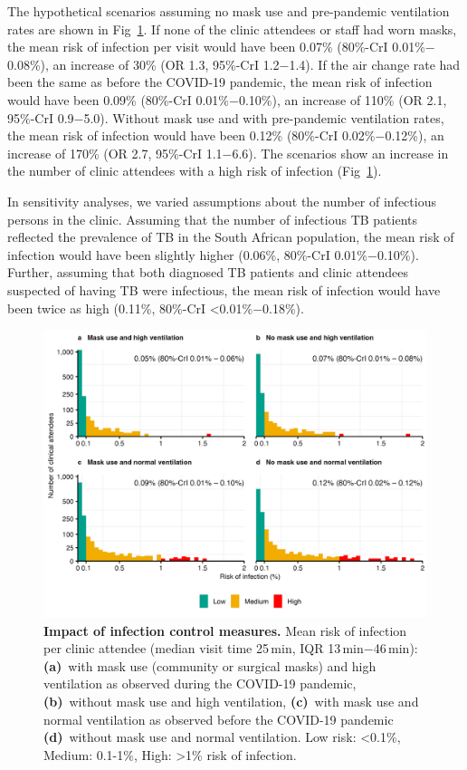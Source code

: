 \documentclass[fleqn,11pt]{wlscirep}
\begin{document}
The hypothetical scenarios assuming no mask use and pre-pandemic ventilation rates are shown in  Fig~\ref{fig:scenario-results}. If none of the clinic attendees or staff had worn masks, the mean risk of infection per visit would have been 0.07\% (80\%-CrI 0.01\%$-$0.08\%), an increase of 30\% (OR 1.3, 95\%-CrI 1.2$-$1.4). If the air change rate had been the same as before the COVID-19 pandemic, the mean risk of infection would have been 0.09\% (80\%-CrI 0.01\%$-$0.10\%), an increase of 110\% (OR 2.1, 95\%-CrI 0.9$-$5.0). Without mask use and with pre-pandemic ventilation rates, the mean risk of infection would have been 0.12\% (80\%-CrI 0.02\%$-$0.12\%), an increase of 170\% (OR 2.7, 95\%-CrI 1.1$-$6.6). The scenarios show an increase in the number of clinic attendees with a high risk of infection (Fig~\ref{fig:scenario-results}). 

In sensitivity analyses, we varied assumptions about the number of infectious persons in the clinic. Assuming that the number of infectious TB patients reflected the prevalence of TB in the South African population, the mean risk of infection would have been slightly higher (0.06\%, 80\%-CrI 0.01\%$-$0.10\%). Further, assuming that both diagnosed TB patients and clinic attendees suspected of having TB were infectious, the mean risk of infection would have been twice as high (0.11\%, 80\%-CrI <0.01\%$-$0.18\%).  

\begin{figure}
    \centering
    \includegraphics{results/modeling/mean-roi-comparison.png}
    \caption{\textbf{Impact of infection control measures.} Mean risk of infection per clinic attendee (median visit time 25\,min, IQR 13\,min$-$46\,min): \textbf{(a)}~with mask use (community or surgical masks) and high ventilation as observed during the COVID-19 pandemic, \textbf{(b)}~without mask use and high ventilation, \textbf{(c)}~with mask use and normal ventilation as observed before the COVID-19 pandemic  \textbf{(d)}~without mask use and normal ventilation. Low risk: <0.1\%, Medium: 0.1-1\%, High: >1\% risk of infection.}
    \label{fig:scenario-results}
\end{figure}
\end{document}
